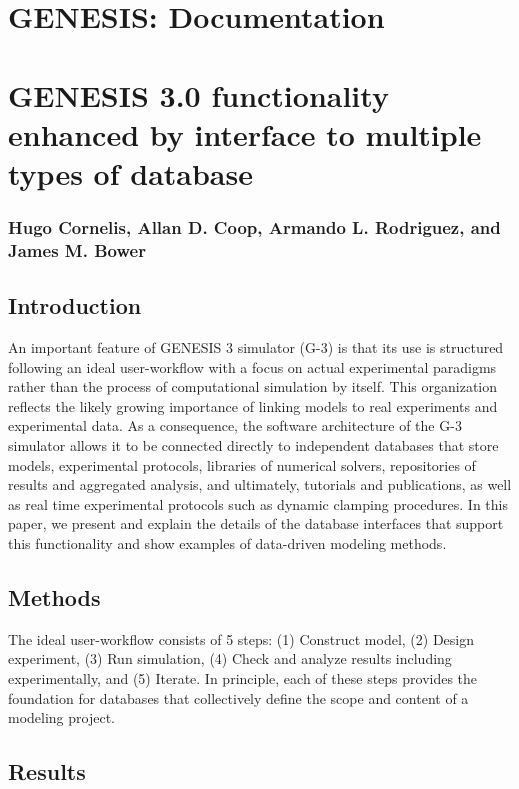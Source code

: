 \documentclass[12pt]{article}
\begin{document}
\section*{GENESIS: Documentation}

\section*{GENESIS 3.0 functionality enhanced by interface to multiple types of database}

\subsubsection*{Hugo Cornelis, Allan D. Coop, Armando L. Rodriguez, and James M. Bower}

\subsection*{Introduction}

An important feature of GENESIS 3 simulator (G-3) is that its use is
structured following an ideal user-workflow with a focus on actual
experimental paradigms rather than the process of computational
simulation by itself.  This organization reflects the likely growing
importance of linking models to real experiments and experimental
data.  As a consequence, the software architecture of the G-3
simulator allows it to be connected directly to independent databases
that store models, experimental protocols, libraries of numerical
solvers, repositories of results and aggregated analysis, and
ultimately, tutorials and publications, as well as real time
experimental protocols such as dynamic clamping procedures.  In this
paper, we present and explain the details of the database interfaces
that support this functionality and show examples of data-driven
modeling methods.


\subsection*{Methods}

The ideal user-workflow consists of 5 steps: (1) Construct model, (2)
Design experiment, (3) Run simulation, (4) Check and analyze results
including experimentally, and (5) Iterate. In principle, each of these
steps provides the foundation for databases that collectively define
the scope and content of a modeling project.

\subsection*{Results}
\end{document}
